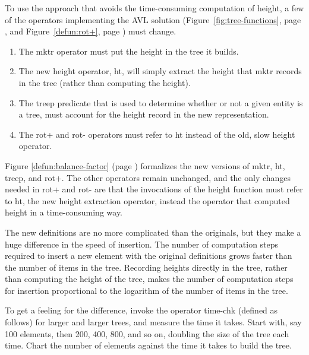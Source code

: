 To use the approach that avoids
the time-consuming computation of height,
a few of the operators implementing the AVL solution
(Figure~\ref{fig:tree-functions}, page \pageref{fig:tree-functions}, and
Figure~\ref{defun:rot+}, page \pageref{defun:rot+})
must change.

\begin{enumerate}
\item The \textsf{mktr} operator must put the height in the tree it builds.
\item The new height operator, \textsf{ht},
      will simply extract the height that \textsf{mktr}
      records in the tree (rather than computing the height).
\item The \textsf{treep} predicate that is used to determine whether or not
      a given entity is a tree, must account for the
      height record in the new representation.
\item The \textsf{rot}+ and \textsf{rot-} operators must refer to \textsf{ht}
      instead of the old, slow \textsf{height} operator.
\end{enumerate}

Figure \ref{defun:balance-factor} (page \pageref{defun:balance-factor})
formalizes the new versions of
\textsf{mktr}, \textsf{ht}, \textsf{treep}, and \textsf{rot}+.
The other operators remain unchanged,
and the only changes needed in \textsf{rot}+ and \textsf{rot-}
are that the invocations of the height function
must refer to \textsf{ht},
the new height extraction operator,
instead the operator that computed height
in a time-consuming way.

The new definitions are no more complicated than the originals,
but they make a huge difference in the speed of insertion.
The number of computation steps required to insert a new
element with the original definitions grows faster than
the number of items in the tree.
Recording heights directly in the tree,
rather than computing the height of the tree,
makes the number of computation
steps for insertion proportional to the logarithm of
the number of items in the tree.

To get a feeling for the difference, invoke the operator time-chk
(defined as follows) for larger and larger trees,
and measure the time it takes.
Start with, say 100 elements, then 200, 400, 800, and
so on, doubling the size of the tree each time.
Chart the number of elements against
the time it takes to build the tree.

